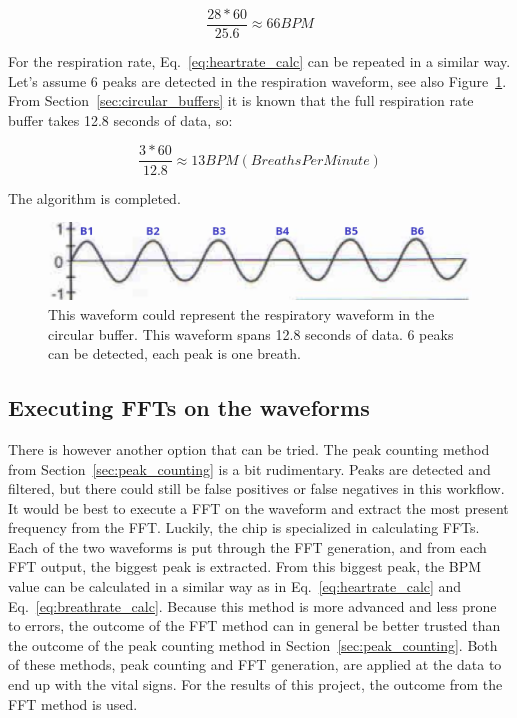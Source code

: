 \begin{equation}
\label{eq:heartrate_calc}
    \frac{28 * 60}{25.6} \approx 66 {BPM}
\end{equation}

For the respiration rate, Eq.~\ref{eq:heartrate_calc} can be repeated in a similar way. Let's assume 6 peaks are detected in the respiration waveform, see also Figure~\ref{fig:breath_peak_counting}. From Section~\ref{sec:circular_buffers} it is known that the full respiration rate buffer takes 12.8 seconds of data, so:

\begin{equation}
\label{eq:breathrate_calc}
    \frac{3 * 60}{12.8} \approx 13 {BPM (Breaths Per Minute)}
\end{equation}

The algorithm is completed.

\begin{figure}[t]
\centering
\includegraphics[width=.8\textwidth]{figures/measuring_vital_signs/breath_peak_counting.png}
\caption{This waveform could represent the respiratory waveform in the circular buffer. This waveform spans 12.8 seconds of data. 6 peaks can be detected, each peak is one breath.}
\label{fig:breath_peak_counting}
\end{figure}

\subsection{Executing FFTs on the waveforms}
There is however another option that can be tried. The peak counting method from Section~\ref{sec:peak_counting} is a bit rudimentary. Peaks are detected and filtered, but there could still be false positives or false negatives in this workflow. It would be best to execute a FFT on the waveform and extract the most present frequency from the FFT. Luckily, the chip is specialized in calculating FFTs. Each of the two waveforms is put through the FFT generation, and from each FFT output, the biggest peak is extracted. From this biggest peak, the BPM value can be calculated in a similar way as in Eq.~\ref{eq:heartrate_calc} and Eq.~\ref{eq:breathrate_calc}. Because this method is more advanced and less prone to errors, the outcome of the FFT method can in general be better trusted than the outcome of the peak counting method in Section~\ref{sec:peak_counting}. Both of these methods, peak counting and FFT generation, are applied at the data to end up with the vital signs. For the results of this project, the outcome from the FFT method is used.